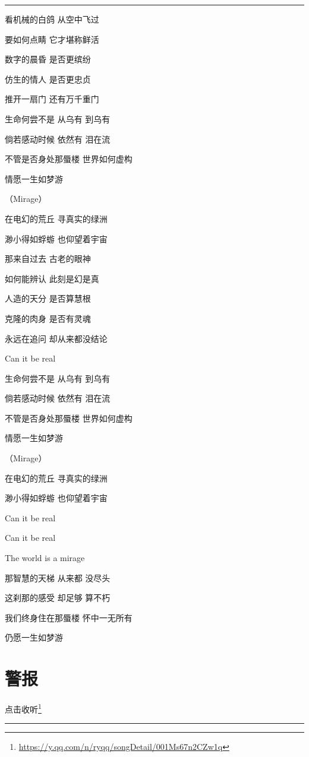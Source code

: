 \documentclass[]{ctexbook}
\renewcommand{\href}[2]{#2\footnote{\url{#1}}}
\begin{document}
\begin{center}\rule{0.5\linewidth}{0.5pt}\end{center}

看机械的白鸽 从空中飞过

要如何点睛 它才堪称鲜活

数字的晨昏 是否更缤纷

仿生的情人 是否更忠贞

推开一扇门 还有万千重门

生命何尝不是 从乌有 到乌有

倘若感动时候 依然有 泪在流

不管是否身处那蜃楼 世界如何虚构

情愿一生如梦游

（Mirage）

在电幻的荒丘 寻真实的绿洲

渺小得如蜉蝣 也仰望着宇宙

那来自过去 古老的眼神

如何能辨认 此刻是幻是真

人造的天分 是否算慧根

克隆的肉身 是否有灵魂

永远在追问 却从来都没结论

Can it be real

生命何尝不是 从乌有 到乌有

倘若感动时候 依然有 泪在流

不管是否身处那蜃楼 世界如何虚构

情愿一生如梦游

（Mirage）

在电幻的荒丘 寻真实的绿洲

渺小得如蜉蝣 也仰望着宇宙

Can it be real

Can it be real

The world is a mirage

那智慧的天梯 从来都 没尽头

这刹那的感受 却足够 算不朽

我们终身住在那蜃楼 怀中一无所有

仍愿一生如梦游

\section*{警报}\label{the-giver}


\href{https://y.qq.com/n/ryqq/songDetail/001Ms67n2CZw1q}{点击收听}

\begin{center}\rule{0.5\linewidth}{0.5pt}\end{center}
\end{document}
